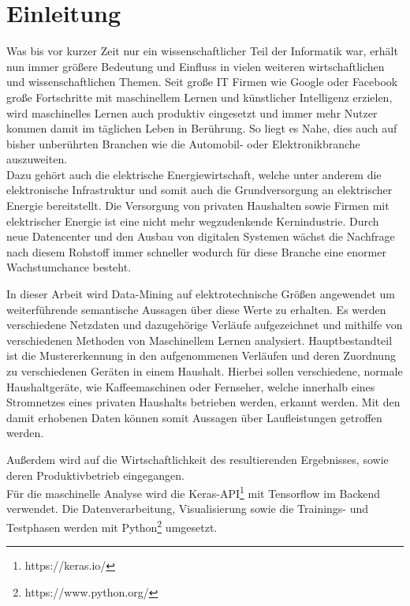 \chapter{Einleitung}

    Was bis vor kurzer Zeit nur ein wissenschaftlicher Teil der Informatik war, erhält nun immer größere Bedeutung und Einfluss in vielen weiteren wirtschaftlichen und wissenschaftlichen Themen. 
    Seit große IT Firmen wie Google oder Facebook große Fortschritte mit maschinellem Lernen und künstlicher Intelligenz erzielen, wird maschinelles Lernen auch produktiv eingesetzt und immer mehr Nutzer kommen damit im täglichen Leben in Berührung.
    So liegt es Nahe, dies auch auf bisher unberührten Branchen wie die Automobil- oder Elektronikbranche auszuweiten.\\
    \newline
    Dazu gehört auch die elektrische Energiewirtschaft, welche unter anderem die elektronische Infrastruktur und somit auch die Grundversorgung an elektrischer Energie bereitstellt.
    Die Versorgung von privaten Haushalten sowie Firmen mit elektrischer Energie ist eine nicht mehr wegzudenkende Kernindustrie.
    Durch neue Datencenter und den Ausbau von digitalen Systemen wächst die Nachfrage nach diesem Rohstoff immer schneller wodurch für diese Branche eine enormer Wachstumchance besteht.
    \newline

    In dieser Arbeit wird Data-Mining auf elektrotechnische Größen angewendet um weiterführende semantische Aussagen über diese Werte zu erhalten. 
    Es werden verschiedene Netzdaten und dazugehörige Verläufe aufgezeichnet und mithilfe von verschiedenen Methoden von Maschinellem Lernen analysiert.
    Hauptbestandteil ist die Mustererkennung in den aufgenommenen Verläufen und deren Zuordnung zu verschiedenen Geräten in einem Haushalt. 
    Hierbei sollen verschiedene, normale Haushaltgeräte, wie Kaffeemaschinen oder Fernseher, welche innerhalb eines Stromnetzes eines privaten Haushalts betrieben werden, erkannt werden.
    Mit den damit erhobenen Daten können somit Aussagen über Laufleistungen getroffen werden.
    \newline
    
    Außerdem wird auf die Wirtschaftlichkeit des resultierenden Ergebnisses, sowie deren Produktivbetrieb eingegangen.\\
    \newline
    Für die maschinelle Analyse wird die Keras-API\footnote{https://keras.io/} mit Tensorflow im Backend verwendet.
    Die Datenverarbeitung, Visualisierung sowie die Trainings- und Testphasen werden mit Python\footnote{https://www.python.org/} umgesetzt.
